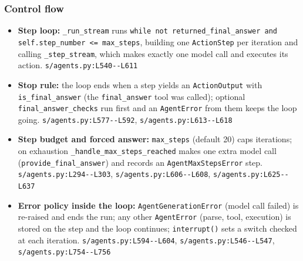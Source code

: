\subsubsection*{Control flow}
\begin{itemize}
\item \textbf{Step loop:} \texttt{\_\allowbreak{}run\_\allowbreak{}stream} runs \texttt{while not returned\_\allowbreak{}final\_\allowbreak{}answer and self.\allowbreak{}step\_\allowbreak{}number <= max\_\allowbreak{}steps}, building one \texttt{ActionStep} per iteration and calling \texttt{\_\allowbreak{}step\_\allowbreak{}stream}, which makes exactly one model call and executes its action. \texttt{s/\allowbreak{}agents.\allowbreak{}py:\allowbreak{}L540-\allowbreak{}-\allowbreak{}L611}
\item \textbf{Stop rule:} the loop ends when a step yields an \texttt{ActionOutput} with \texttt{is\_\allowbreak{}final\_\allowbreak{}answer} (the \texttt{final\_\allowbreak{}answer} tool was called); optional \texttt{final\_\allowbreak{}answer\_\allowbreak{}checks} run first and an \texttt{AgentError} from them keeps the loop going. \texttt{s/\allowbreak{}agents.\allowbreak{}py:\allowbreak{}L577-\allowbreak{}-\allowbreak{}L592}, \texttt{s/\allowbreak{}agents.\allowbreak{}py:\allowbreak{}L613-\allowbreak{}-\allowbreak{}L618}
\item \textbf{Step budget and forced answer:} \texttt{max\_\allowbreak{}steps} (default 20) caps iterations; on exhaustion \texttt{\_\allowbreak{}handle\_\allowbreak{}max\_\allowbreak{}steps\_\allowbreak{}reached} makes one extra model call (\texttt{provide\_\allowbreak{}final\_\allowbreak{}answer}) and records an \texttt{AgentMaxStepsError} step. \texttt{s/\allowbreak{}agents.\allowbreak{}py:\allowbreak{}L294-\allowbreak{}-\allowbreak{}L303}, \texttt{s/\allowbreak{}agents.\allowbreak{}py:\allowbreak{}L606-\allowbreak{}-\allowbreak{}L608}, \texttt{s/\allowbreak{}agents.\allowbreak{}py:\allowbreak{}L625-\allowbreak{}-\allowbreak{}L637}
\item \textbf{Error policy inside the loop:} \texttt{AgentGenerationError} (model call failed) is re-raised and ends the run; any other \texttt{AgentError} (parse, tool, execution) is stored on the step and the loop continues; \texttt{interrupt(\allowbreak{})} sets a switch checked at each iteration. \texttt{s/\allowbreak{}agents.\allowbreak{}py:\allowbreak{}L594-\allowbreak{}-\allowbreak{}L604}, \texttt{s/\allowbreak{}agents.\allowbreak{}py:\allowbreak{}L546-\allowbreak{}-\allowbreak{}L547}, \texttt{s/\allowbreak{}agents.\allowbreak{}py:\allowbreak{}L754-\allowbreak{}-\allowbreak{}L756}

\end{itemize}
